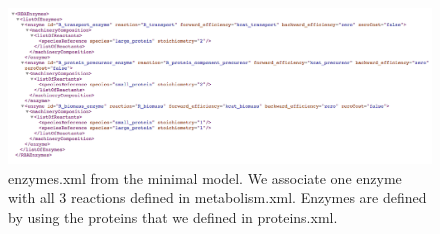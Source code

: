\begin{figure}
  \centering
  \includegraphics[scale=0.6]{figures/enzymes_ex_2}
  \caption{enzymes.xml from the minimal model.
  We associate one enzyme with all 3 reactions defined in metabolism.xml.
  Enzymes are defined by using the proteins that we defined in proteins.xml.}
  \label{fig:enzymes_ex_2}
\end{figure}
